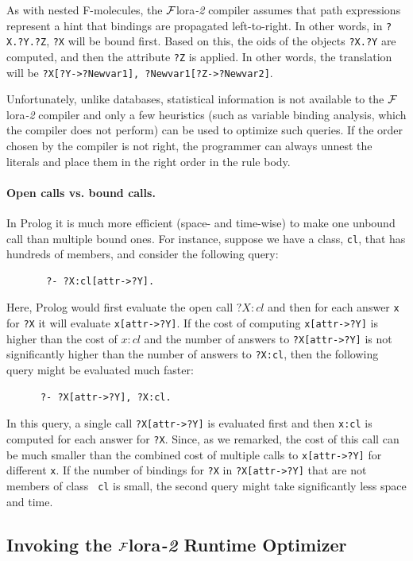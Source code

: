 \documentclass[11pt]{article}
\newcommand{\FLORA}{{\mbox{\sc ${\cal F}${lora}\rm\emph{-2}}}\xspace}
\begin{document}
As with nested F-molecules, the \FLORA compiler assumes that path
expressions represent a hint that bindings are propagated left-to-right.
In other words, in {\tt ?X.?Y.?Z}, {\tt ?X} will be bound first.
Based on this, the oids of the objects {\tt ?X.?Y} are computed, and
then the attribute {\tt ?Z} is applied. In other words, the translation will
be {\tt ?X[?Y->?Newvar1], ?Newvar1[?Z->?Newvar2]}.

Unfortunately, unlike databases, statistical information is not
available to the \FLORA compiler and only a few heuristics (such as
variable binding analysis, which the compiler does not perform) can be used
to optimize such queries. If the order chosen by the compiler is not right,
the programmer can always unnest the literals and place them in the right
order in the rule body.

\paragraph{Open calls vs. bound calls.}
In Prolog it is much more efficient (space- and
time-wise) to make one unbound call than multiple bound ones. For instance,
suppose we have a class, {\tt cl}, that has hundreds of members, and
consider the following query:
\begin{verbatim}
       ?- ?X:cl[attr->?Y].  
\end{verbatim}
Here, Prolog would first evaluate the open call $?X:cl$ and then for each
answer {\tt x} for {\tt ?X} it will evaluate {\tt x[attr->?Y]}.
If the cost of computing {\tt x[attr->?Y]} is higher than the cost of $x:cl$
and the number of answers to {\tt ?X[attr->?Y]} is not significantly
higher than the number of answers to {\tt ?X:cl}, then the following query
might be evaluated much faster:
\begin{verbatim}
      ?- ?X[attr->?Y], ?X:cl.  
\end{verbatim}
In this query, a single call {\tt ?X[attr->?Y]} is evaluated first and then
{\tt x:cl} is computed for each answer for {\tt ?X}.  Since, as we remarked,
the cost of this call can be much smaller than the combined cost of
multiple calls to {\tt x[attr->?Y]} for different {\tt x}.  If the number of
bindings for {\tt ?X} in {\tt ?X[attr->?Y]} that are not members of class {\tt
  cl} is small, the second query might take significantly less space and
time.

\subsection{Invoking the \FLORA Runtime Optimizer}
\label{sec-runtime-optimizer}
\end{document}
